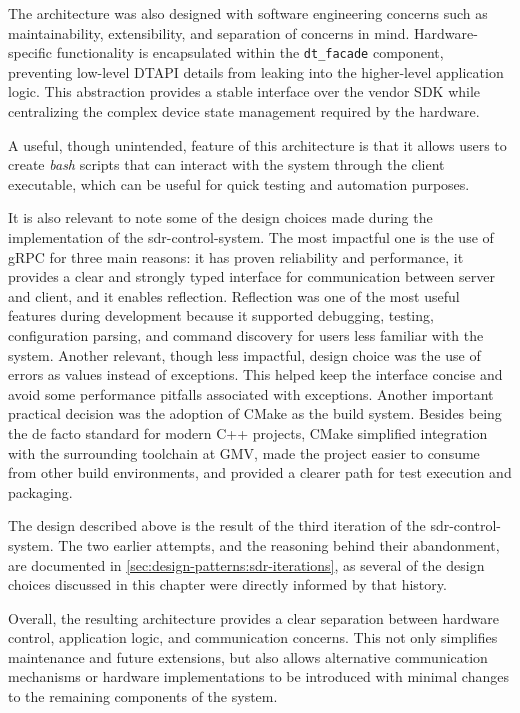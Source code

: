 The architecture was also designed with software engineering concerns such as
maintainability, extensibility, and separation of concerns in mind.
Hardware-specific functionality is encapsulated within the \texttt{dt\_facade}
component, preventing low-level \gls{DTAPI} details from leaking into the
higher-level application logic. This abstraction provides a stable interface
over the vendor SDK while centralizing the complex device state management
required by the hardware.

A useful, though unintended, feature of this architecture is that it allows
users to create \textit{bash} scripts that can
interact with the system through the client executable, which can be useful for
quick testing and automation purposes.

It is also relevant to note some of the design choices made during the
implementation of the \gls{sdr-control-system}. The most impactful one is the
use of \gls{gRPC} for three main reasons: it has proven reliability and
performance, it provides a clear and strongly typed interface for communication
between server and client, and it enables reflection. Reflection was one of the
most useful features during development because it supported debugging, testing,
configuration parsing, and command discovery for users less familiar with the
system. Another relevant, though less impactful, design choice was the use of
errors as values instead of exceptions. This helped keep the interface concise
and avoid some performance pitfalls associated with exceptions. Another
important practical decision was the adoption of CMake as the build system.
Besides being the de facto standard for modern C++ projects, CMake simplified
integration with the surrounding toolchain at \gls{GMV}, made the project
easier to consume from other build environments, and provided a clearer path
for test execution and packaging.\cite{cmake}

The design described above is the result of the third iteration of the
\gls{sdr-control-system}. The two earlier attempts, and the reasoning behind
their abandonment, are documented in
\autoref{sec:design-patterns:sdr-iterations}, as several of the design choices
discussed in this chapter were directly informed by that history.

Overall, the resulting architecture provides a clear separation between
hardware control, application logic, and communication concerns. This not only
simplifies maintenance and future extensions, but also allows alternative
communication mechanisms or hardware implementations to be introduced with
minimal changes to the remaining components of the system.

